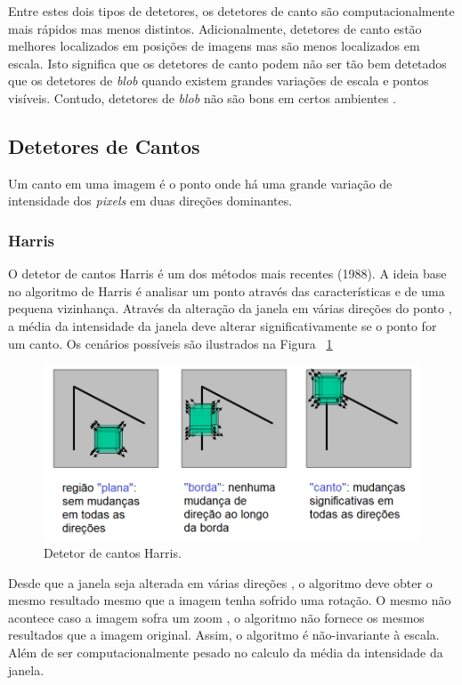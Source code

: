 Entre estes dois tipos de detetores, os detetores de canto são computacionalmente mais rápidos mas menos distintos. Adicionalmente, detetores de canto estão melhores localizados em posições de imagens mas são menos localizados em escala. Isto significa que os detetores de canto podem não ser tão bem detetados que os detetores de \textit{blob} quando existem grandes variações de escala e pontos visíveis. Contudo, detetores de \textit{blob} não são bons em certos ambientes \cite{Fraundorfer2012}.

\subsection{Detetores de Cantos}

Um canto em uma imagem é o ponto onde há uma grande variação de intensidade dos \textit{pixels} em duas direções dominantes. 

\subsubsection{Harris}

O detetor de cantos Harris é um dos métodos mais recentes (1988). A ideia base no algoritmo de Harris é analisar um ponto através das características e de uma pequena vizinhança. Através da alteração da janela em várias direções do ponto , a média da intensidade da janela deve alterar significativamente se o ponto for um canto. Os cenários possíveis são ilustrados na Figura ~\ref{fig:harriscornerdetection}

\begin{figure}[h!]
	\centering
	\includegraphics[width=0.7\linewidth]{figures/HarrisCornerDetection}
	\caption{Detetor de cantos Harris. \cite{VisualOdometryRodasVehicles}}
	\label{fig:harriscornerdetection}
\end{figure}

Desde que a janela seja alterada em várias direções , o algoritmo deve obter o mesmo resultado mesmo que a imagem tenha sofrido uma rotação. O mesmo não acontece caso a imagem sofra um zoom , o algoritmo não fornece os mesmos resultados que a imagem original. Assim, o algoritmo é não-invariante à escala. Além de ser computacionalmente pesado no calculo da média da intensidade da janela. %


